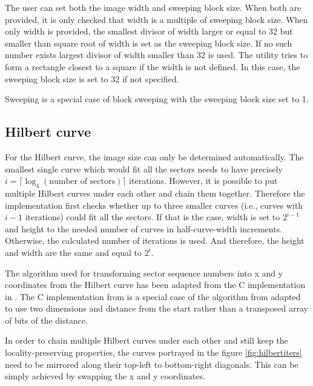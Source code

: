 \documentclass[
  digital, %
  oneside, %
  lof,     %
  lot,     %
]{fithesis4}
\begin{document}
The user can set both the image width and sweeping block size.
When both are provided, it is only checked that width is a multiple of sweeping block size.
When only width is provided, the smallest divisor of width larger or equal to 32 but smaller than square root of width is set as the sweeping block size.
If no such number exists largest divisor of width smaller than 32 is used.
The utility tries to form a rectangle closest to a square if the width is not defined.
In this case, the sweeping block size is set to 32 if not specified.

Sweeping is a special case of block sweeping with the sweeping block size set to 1.

\subsection{Hilbert curve}

For the Hilbert curve, the image size can only be determined automatically.
The smallest single curve which would fit all the sectors needs to have precisely $i = \lceil\log_4(\text{number of sectors})\rceil$ iterations.
However, it is possible to put multiple Hilbert curves under each other and chain them together.
Therefore the implementation first checks whether up to three smaller curves (i.e., curves with $i - 1$ iterations) could fit all the sectors.
If that is the case, width is set to $2^{i - 1}$ and height to the needed number of curves in half-curve-width increments.
Otherwise, the calculated number of iterations is used.
And therefore, the height and width are the same and equal to $2^i$.

The algorithm used for transforming sector sequence numbers into x and y coordinates from the Hilbert curve has been adapted from the C implementation in \cite{wikihilbert}.
The C implementation from \cite{wikihilbert} is a special case of the algorithm from \cite{skilling04} adapted to use two dimensions and distance from the start rather than a transposed array of bits of the distance.


In order to chain multiple Hilbert curves under each other and still keep the locality-preserving properties, the curves portrayed in the figure \ref{fig:hilbertiters} need to be mirrored along their top-left to bottom-right diagonals.
This can be simply achieved by swapping the x and y coordinates.
\end{document}
